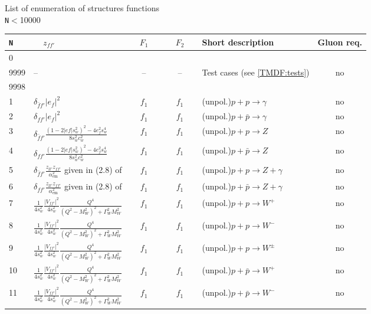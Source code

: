 \documentclass[prd,nofootinbib,eqsecnum,final]{revtex4}
\newcommand{\Ds}{\displaystyle}
\renewcommand{\(}{\left(}
\renewcommand{\)}{\right)}
\renewcommand{\[}{\left[}
\renewcommand{\]}{\right]}
\begin{document}
\renewcommand{\arraystretch}{2.5}
\begin{center}
List of enumeration of structures functions
\\
\texttt{N}$<$10000
\\
\begin{longtable}{||l|p{6cm}|c|c||p{7cm}|c||}
\hline\hline
\texttt{N} & ~~$z_{ff'}$~~& ~~$F_1$~~ & ~~$F_2$~~&  Short description & Gluon req. 
\\\hline
0 &  &  &  &  & 
\\
9999 & -- & -- & -- & Test cases (see \ref{TMDF:tests}) & no
\\
9998 &  &  &  &  & 
\\\hline
1 & $\delta_{\bar f f'}|e_f|^2$ & $f_1$ & $f_1$ & (unpol.)$p+p\to\gamma$ & no
\\\hline
2 & $\delta_{f f'}|e_f|^2$ & $f_1$ & $f_1$ & (unpol.)$p+\bar p\to\gamma$ & no
\\\hline
3 & $\Ds\delta_{\bar f f'}\frac{(1-2|ef|s_w^2)^2-4e_f^2s_w^4}{8s_w^2c_w^2}$ & $f_1$ & $f_1$ & (unpol.)$p+p\to Z$ & no
\\\hline
4 & $\Ds\delta_{f f'}\frac{(1-2|ef|s_w^2)^2-4e_f^2s_w^4}{8s_w^2c_w^2}$ & $f_1$ & $f_1$ & (unpol.)$p+\bar p\to Z$ & no
\\\hline
5 & $\Ds\delta_{\bar f f'}\frac{z_{ll'}z_{ff'}}{\alpha_{\text{em}}^2}$ given in (2.8) of \cite{Scimemi:2017etj} & $f_1$ & $f_1$ & (unpol.)$p+p\to Z+\gamma$ & no
\\\hline
6 & $\Ds\delta_{f f'}\frac{z_{ll'}z_{ff'}}{\alpha_{\text{em}}^2}$ given in (2.8) of \cite{Scimemi:2017etj} & $f_1$ & $f_1$ & (unpol.)$p+\bar p\to Z+\gamma$ & no
\\\hline
7 & $\Ds \frac{1}{4s_w^2}\frac{|V_{f f'}|^2}{4s_w^2}\frac{Q^4}{(Q^2-M_W^2)^2+\Gamma_W^2M_W^2}$ & $f_1$ & $f_1$ & (unpol.)$p+p\to W^+$ & no
\\\hline
8 & $\Ds \frac{1}{4s_w^2}\frac{|V_{f f'}|^2}{4s_w^2}\frac{Q^4}{(Q^2-M_W^2)^2+\Gamma_W^2M_W^2}$ & $f_1$ & $f_1$ & (unpol.)$p+p\to W^-$ & no
\\\hline
9 & $\Ds \frac{1}{4s_w^2}\frac{|V_{f f'}|^2}{4s_w^2}\frac{Q^4}{(Q^2-M_W^2)^2+\Gamma_W^2M_W^2}$ & $f_1$ & $f_1$ & (unpol.)$p+p\to W^\pm$ & no
\\\hline
10 & $\Ds \frac{1}{4s_w^2}\frac{|V_{f f'}|^2}{4s_w^2}\frac{Q^4}{(Q^2-M_W^2)^2+\Gamma_W^2M_W^2}$ & $f_1$ & $f_1$ & (unpol.)$p+\bar p\to W^+$ & no
\\\hline
11 & $\Ds \frac{1}{4s_w^2}\frac{|V_{f f'}|^2}{4s_w^2}\frac{Q^4}{(Q^2-M_W^2)^2+\Gamma_W^2M_W^2}$ & $f_1$ & $f_1$ & (unpol.)$p+\bar p\to W^-$ & no

\end{longtable}
\end{center}
\end{document}
